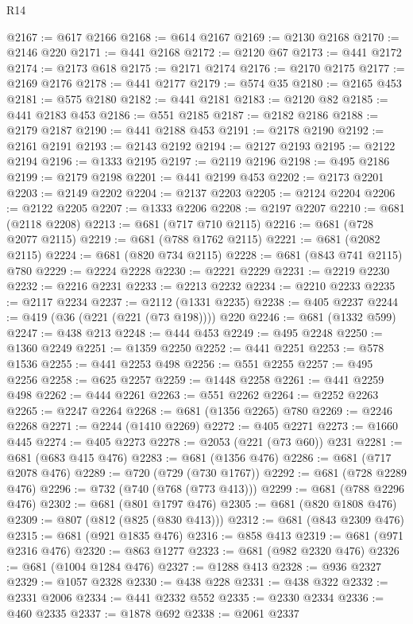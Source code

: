\begin{lexlean}{R14}
\begin{coremodule}
@2167 := @617 @2166
@2168 := @614 @2167
@2169 := @2130 @2168
@2170 := @2146 @220
@2171 := @441 @2168
@2172 := @2120 @67
@2173 := @441 @2172
@2174 := @2173 @618
@2175 := @2171 @2174
@2176 := @2170 @2175
@2177 := @2169 @2176
@2178 := @441 @2177
@2179 := @574 @35
@2180 := @2165 @453
@2181 := @575 @2180
@2182 := @441 @2181
@2183 := @2120 @82
@2185 := @441 @2183 @453
@2186 := @551 @2185
@2187 := @2182 @2186
@2188 := @2179 @2187
@2190 := @441 @2188 @453
@2191 := @2178 @2190
@2192 := @2161 @2191
@2193 := @2143 @2192
@2194 := @2127 @2193
@2195 := @2122 @2194
@2196 := @1333 @2195
@2197 := @2119 @2196
@2198 := @495 @2186
@2199 := @2179 @2198
@2201 := @441 @2199 @453
@2202 := @2173 @2201
@2203 := @2149 @2202
@2204 := @2137 @2203
@2205 := @2124 @2204
@2206 := @2122 @2205
@2207 := @1333 @2206
@2208 := @2197 @2207
@2210 := @681 (@2118 @2208)
@2213 := @681 (@717 @710 @2115)
@2216 := @681 (@728 @2077 @2115)
@2219 := @681 (@788 @1762 @2115)
@2221 := @681 (@2082 @2115)
@2224 := @681 (@820 @734 @2115)
@2228 := @681 (@843 @741 @2115) @780
@2229 := @2224 @2228
@2230 := @2221 @2229
@2231 := @2219 @2230
@2232 := @2216 @2231
@2233 := @2213 @2232
@2234 := @2210 @2233
@2235 := @2117 @2234
@2237 := @2112 (@1331 @2235)
@2238 := @405 @2237
@2244 := @419 (@36 (@221 (@221 (@73 @198)))) @220
@2246 := @681 (@1332 @599)
@2247 := @438 @213
@2248 := @444 @453
@2249 := @495 @2248
@2250 := @1360 @2249
@2251 := @1359 @2250
@2252 := @441 @2251
@2253 := @578 @1536
@2255 := @441 @2253 @498
@2256 := @551 @2255
@2257 := @495 @2256
@2258 := @625 @2257
@2259 := @1448 @2258
@2261 := @441 @2259 @498
@2262 := @444 @2261
@2263 := @551 @2262
@2264 := @2252 @2263
@2265 := @2247 @2264
@2268 := @681 (@1356 @2265) @780
@2269 := @2246 @2268
@2271 := @2244 (@1410 @2269)
@2272 := @405 @2271
@2273 := @1660 @445
@2274 := @405 @2273
@2278 := @2053 (@221 (@73 @60)) @231
@2281 := @681 (@683 @415 @476)
@2283 := @681 (@1356 @476)
@2286 := @681 (@717 @2078 @476)
@2289 := @720 (@729 (@730 @1767))
@2292 := @681 (@728 @2289 @476)
@2296 := @732 (@740 (@768 (@773 @413)))
@2299 := @681 (@788 @2296 @476)
@2302 := @681 (@801 @1797 @476)
@2305 := @681 (@820 @1808 @476)
@2309 := @807 (@812 (@825 (@830 @413)))
@2312 := @681 (@843 @2309 @476)
@2315 := @681 (@921 @1835 @476)
@2316 := @858 @413
@2319 := @681 (@971 @2316 @476)
@2320 := @863 @1277
@2323 := @681 (@982 @2320 @476)
@2326 := @681 (@1004 @1284 @476)
@2327 := @1288 @413
@2328 := @936 @2327
@2329 := @1057 @2328
@2330 := @438 @228
@2331 := @438 @322
@2332 := @2331 @2006
@2334 := @441 @2332 @552
@2335 := @2330 @2334
@2336 := @460 @2335
@2337 := @1878 @692
@2338 := @2061 @2337

\end{coremodule}
\end{lexlean}
